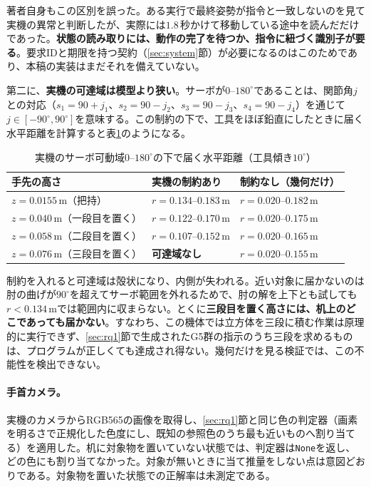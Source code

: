 \documentclass[10pt,letterpaper]{article}
\begin{document}
著者自身もこの区別を誤った。ある実行で最終姿勢が指令と一致しないのを見て実機の異常と判断したが、実際には$1.8$\,秒かけて移動している途中を読んだだけであった。\textbf{状態の読み取りには、動作の完了を待つか、指令に紐づく識別子が要る}。要求IDと期限を持つ契約（\ref{sec:system}節）が必要になるのはこのためであり、本稿の実装はまだそれを備えていない。

第二に、\textbf{実機の可達域は模型より狭い}。サーボが$0$--$180^{\circ}$であることは、関節角$j$との対応（$s_1=90+j_1$、$s_2=90-j_2$、$s_3=90-j_3$、$s_4=90-j_4$）を通じて$j\in[-90^{\circ},90^{\circ}]$を意味する。この制約の下で、工具をほぼ鉛直にしたときに届く水平距離を計算すると表\ref{tab:reach}のようになる。

\begin{table}[h]
\centering\small
\caption{実機のサーボ可動域$0$--$180^{\circ}$の下で届く水平距離（工具傾き$10^{\circ}$）}
\label{tab:reach}
\begin{tabular}{lll}
\toprule
手先の高さ & 実機の制約あり & 制約なし（幾何だけ） \\
\midrule
$z=0.0155$\,m（把持） & $r=0.134$--$0.183$\,m & $r=0.020$--$0.182$\,m \\
$z=0.040$\,m（一段目を置く） & $r=0.122$--$0.170$\,m & $r=0.020$--$0.175$\,m \\
$z=0.058$\,m（二段目を置く） & $r=0.107$--$0.152$\,m & $r=0.020$--$0.165$\,m \\
$z=0.076$\,m（三段目を置く） & \textbf{可達域なし} & $r=0.020$--$0.155$\,m \\
\bottomrule
\end{tabular}
\end{table}

制約を入れると可達域は殻状になり、内側が失われる。近い対象に届かないのは肘の曲げが$90^{\circ}$を超えてサーボ範囲を外れるためで、肘の解を上下とも試しても$r<0.134$\,mでは範囲内に収まらない。とくに\textbf{三段目を置く高さには、机上のどこであっても届かない}。すなわち、この機体では立方体を三段に積む作業は原理的に実行できず、\ref{sec:rq1}節で生成されたG5群の指示のうち三段を求めるものは、プログラムが正しくても達成され得ない。幾何だけを見る検証では、この不能性を検出できない。

\paragraph{手首カメラ。}実機のカメラからRGB565の画像を取得し、\ref{sec:rq1}節と同じ色の判定器（画素を明るさで正規化した色度にし、既知の参照色のうち最も近いものへ割り当てる）を適用した。机に対象物を置いていない状態では、判定器は\texttt{None}を返し、どの色にも割り当てなかった。対象が無いときに当て推量をしない点は意図どおりである。対象物を置いた状態での正解率は未測定である。
\end{document}
